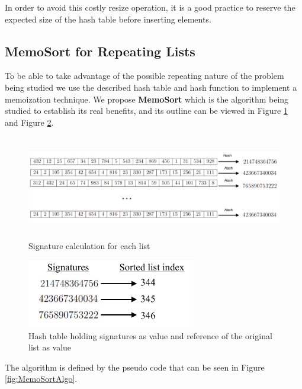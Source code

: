 \documentclass[a4paper,12pt]{article}
\begin{document}
In order to avoid this costly resize operation, it is a good practice to reserve the expected size of the hash table before inserting elements. 

\subsection{MemoSort for Repeating Lists}
To be able to take advantage of the possible repeating nature of the problem being studied we use the described hash table and hash function to implement a memoization technique. We propose \textbf{MemoSort} which is the algorithm being studied to establish its real benefits, and its outline can be viewed in Figure \ref{fig:MemoSortDiagram} and Figure \ref{fig:MemoSortDiagramHash}.

\begin{figure}[H]
    \centering
     \includegraphics[height=4.5cm,keepaspectratio]{./images/MemoSortDiagram.png}
    \caption{Signature calculation for each list}
    \label{fig:MemoSortDiagram}
\end{figure}

\begin{figure}[H]
    \centering
     \includegraphics[height=3cm,keepaspectratio]{./images/hashTableDiagram.png}
    \caption{Hash table holding signatures as value and reference of the original list as value}
    \label{fig:MemoSortDiagramHash}
\end{figure}

The algorithm is defined by the pseudo code that can be seen in  Figure \ref{fig:MemoSortAlgo}.
\end{document}
